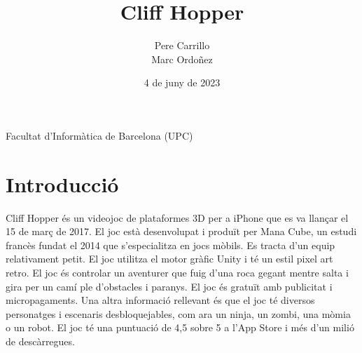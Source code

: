 \documentclass{article}
\title{\Huge\textbf{Cliff Hopper}}
\author{\LARGE Pere Carrillo\\ \LARGE Marc Ordoñez}
\date{4 de juny de 2023}
\begin{document}
\maketitle

\begin{center}
   \Large Facultat d'Informàtica de Barcelona (UPC)
\end{center}

\vspace{5cm}
\begin{figure} [H]
    \centering
    
\end{figure}

\newpage

\section{Introducció}
Cliff Hopper és un videojoc de plataformes 3D per a iPhone que es va llançar el 15 de març de 2017. 
El joc està desenvolupat i produït per Mana Cube, un estudi francès fundat el 2014 que s'especialitza en jocs mòbils. 
Es tracta d'un equip relativament petit. El joc utilitza el motor gràfic Unity i té un estil pixel art retro. 
El joc és controlar un aventurer que fuig d'una roca gegant mentre salta i gira per un camí ple d'obstacles i paranys. 
El joc és gratuït amb publicitat i micropagaments. Una altra informació rellevant és que el joc té diversos personatges i 
escenaris desbloquejables, com ara un ninja, un zombi, una mòmia o un robot. El joc té una puntuació de 4,5 sobre 5 a l'App 
Store i més d'un milió de descàrregues.
\end{document}
